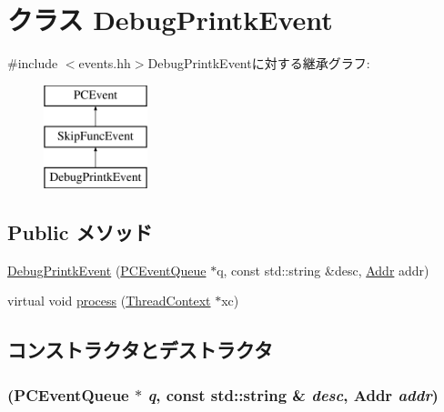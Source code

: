 \hypertarget{classLinux_1_1DebugPrintkEvent}{
\section{クラス DebugPrintkEvent}
\label{classLinux_1_1DebugPrintkEvent}
}


{\ttfamily \#include $<$events.hh$>$}DebugPrintkEventに対する継承グラフ:\begin{figure}[H]
\begin{center}
\leavevmode
\includegraphics[height=3cm]{classLinux_1_1DebugPrintkEvent}
\end{center}
\end{figure}
\subsection*{Public メソッド}
\begin{DoxyCompactItemize}
\item 
\hyperlink{classLinux_1_1DebugPrintkEvent_a4322bd84f8bb036e71fc0ff161f5f8ca}{DebugPrintkEvent} (\hyperlink{classPCEventQueue}{PCEventQueue} $\ast$q, const std::string \&desc, \hyperlink{base_2types_8hh_af1bb03d6a4ee096394a6749f0a169232}{Addr} addr)
\item 
virtual void \hyperlink{classLinux_1_1DebugPrintkEvent_a7f346b2e15a406283e587b1123735488}{process} (\hyperlink{classThreadContext}{ThreadContext} $\ast$xc)
\end{DoxyCompactItemize}


\subsection{コンストラクタとデストラクタ}
\hypertarget{classLinux_1_1DebugPrintkEvent_a4322bd84f8bb036e71fc0ff161f5f8ca}{
\subsubsection[{DebugPrintkEvent}]{ ({\bf PCEventQueue} $\ast$ {\em q}, \/  const std::string \& {\em desc}, \/  {\bf Addr} {\em addr})}}
\label{classLinux_1_1DebugPrintkEvent_a4322bd84f8bb036e71fc0ff161f5f8ca}



